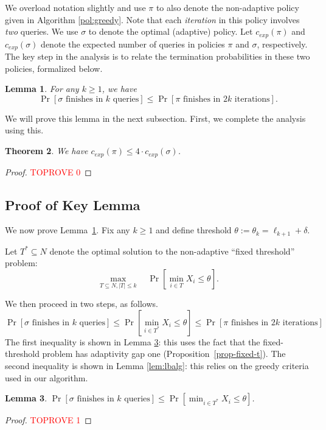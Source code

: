 \documentclass[11pt]{article}
\newtheorem{thm}{Theorem}[section]
\newtheorem{lem}[thm]{Lemma}
\theoremstyle{remark}
\theoremstyle{plain}
\theoremstyle{remark}
\begin{document}
We overload notation slightly and use $\pi$ to also denote the non-adaptive policy given in Algorithm \ref{pol:greedy}. Note that each {\em iteration} in this policy involves {\em two} queries. We use $\sigma$ to denote the optimal (adaptive) policy. Let $c_{exp}(\pi)$ and $c_{exp}(\sigma)$ denote the expected number of queries in policies $\pi$ and $\sigma$, respectively. 
The key step in the analysis is to relate the termination probabilities in these two policies, formalized below. 
\begin{lem} \label{lem:unit-main} For any $k\ge 1$, we have 
$$\Pr[\sigma\text{ finishes in }k \text{ queries}]  \leq \Pr[\pi \text{ finishes in 2}k \text{ iterations}].$$    
\end{lem}
We will prove this lemma in the next subsection. First, we complete the analysis using this.
\begin{thm}
\label{thm:main} We have $c_{exp}(\pi) \leq 4\cdot c_{exp}(\sigma)$.    
\end{thm}

\begin{proof}\textcolor{red}{TOPROVE 0}\end{proof}


\subsection{Proof of Key Lemma}
We now prove Lemma~\ref{lem:unit-main}. Fix any $k\ge 1$ and define threshold  $\theta:=\theta_k= \ell_{k+1}+\delta$.

Let $T^*\subseteq   N$ denote the optimal solution to the non-adaptive ``fixed threshold'' problem:
\begin{equation}
    \label{eq:t*}
\max_{T\subseteq N, |T|\le k}\quad \Pr\left[ \min_{i\in T}  X_i \le \theta\right].\end{equation}
 

We then proceed in  two steps, as follows.
$$        \Pr[\sigma\text{ finishes in }k \text{ queries}]  \leq \Pr\left[\min_{i \in T^*} X_i  \le  \theta\right] \leq \Pr[\pi \text{ finishes in }2k \text{ iterations}] 
$$ 
The first inequality is  shown in Lemma \ref{lem:exists}: this uses the fact that  the fixed-threshold problem 
has  adaptivity gap one (Proposition~\ref{prop-fixed-t}). The second inequality is  shown in Lemma \ref{lem:lbalg}: this relies on the greedy criteria used in our algorithm.





\begin{lem}
\label{lem:exists} $\Pr[\sigma\text{ finishes in }k \text{ queries}]  \leq \Pr\left[\min_{i \in T^*} X_i  \le  \theta\right]$.   
\end{lem}
\begin{proof}\textcolor{red}{TOPROVE 1}\end{proof}
\end{document}
